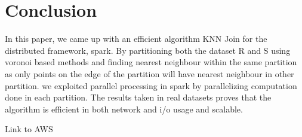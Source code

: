 \documentclass[12pt]{article}
\begin{document}
\medskip


\bigskip

\section{Conclusion}
In this paper, we came up with an efficient algorithm KNN Join for the
distributed framework, spark. By partitioning both the dataset R and S
using voronoi based methods and finding nearest neighbour within the
same partition as only points on the edge of the partition will have
nearest neighbour in other partition. we exploited parallel processing
in spark by parallelizing computation done in each partition. The
results taken in real datasets proves that the algorithm is efficient
in both network and i/o usage and scalable.

Link to AWS

%
%
\end{document}
